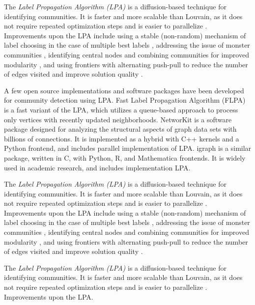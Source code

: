 The \textit{Label Propagation Algorithm (LPA)} is a diffusion-based technique for identifying communities. It is faster and more scalable than Louvain, as it does not require repeated optimization steps and is easier to parallelize \cite{com-newman04, com-raghavan07}. Improvements upon the LPA include using a stable (non-random) mechanism of label choosing in the case of multiple best labels \cite{com-xing14}, addressing the issue of monster communities \cite{com-berahmand18, com-sattari18}, identifying central nodes and combining communities for improved modularity \cite{com-you20}, and using frontiers with alternating push-pull to reduce the number of edges visited and improve solution quality \cite{com-liu20}.

A few open source implementations and software packages have been developed for community detection using LPA. Fast Label Propagation Algorithm (FLPA) \cite{traag2023large} is a fast variant of the LPA, which utilizes a queue-based approach to process only vertices with recently updated neighborhoods. NetworKit \cite{staudt2016networkit} is a software package designed for analyzing the structural aspects of graph data sets with billions of connections. It is implemented as a hybrid with C++ kernels and a Python frontend, and includes parallel implementation of LPA. igraph \cite{csardi2006igraph} is a similar package, written in C, with Python, R, and Mathematica frontends. It is widely used in academic research, and includes implementation LPA.

The \textit{Label Propagation Algorithm (LPA)} is a diffusion-based technique for identifying communities. It is faster and more scalable than Louvain, as it does not require repeated optimization steps and is easier to parallelize \cite{com-newman04, com-raghavan07}. Improvements upon the LPA include using a stable (non-random) mechanism of label choosing in the case of multiple best labels \cite{com-xing14}, addressing the issue of monster communities \cite{com-berahmand18, com-sattari18}, identifying central nodes and combining communities for improved modularity \cite{com-you20}, and using frontiers with alternating push-pull to reduce the number of edges visited and improve solution quality \cite{com-liu20}.

The \textit{Label Propagation Algorithm (LPA)} is a diffusion-based technique for identifying communities. It is faster and more scalable than Louvain, as it does not require repeated optimization steps and is easier to parallelize \cite{com-newman04, com-raghavan07}. Improvements upon the LPA.



